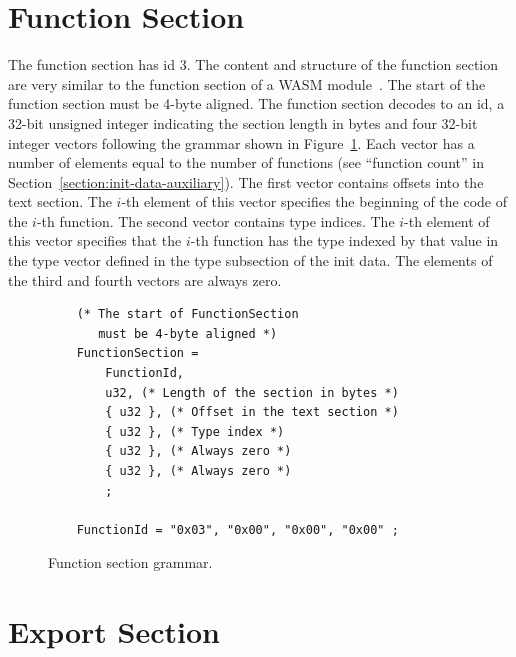 \documentclass{article}
\begin{document}
\section{Function Section}
The function section has id 3.
The content and structure of the function section are very similar to the function section of a WASM module~\cite[Sec.~5.5.6]{webassembly2019core}.
The start of the function section must be 4-byte aligned.
The function section decodes to an id, a 32-bit unsigned integer indicating the section length in bytes and four 32-bit integer vectors following the grammar shown in Figure~\ref{fig:function-section-grammar}.
Each vector has a number of elements equal to the number of functions (see ``function count'' in Section~\ref{section:init-data-auxiliary}).
The first vector contains offsets into the text section.
The $i$-th element of this vector specifies the beginning of the code of the $i$-th function.
The second vector contains type indices.
The $i$-th element of this vector specifies that the $i$-th function has the type indexed by that value in the type vector defined in the type subsection of the init data.
The elements of the third and fourth vectors are always zero.

\begin{figure}[H]
\begin{verbatim}
    (* The start of FunctionSection
       must be 4-byte aligned *)
    FunctionSection =
        FunctionId,
        u32, (* Length of the section in bytes *)
        { u32 }, (* Offset in the text section *)
        { u32 }, (* Type index *)
        { u32 }, (* Always zero *)
        { u32 }, (* Always zero *)
        ;

    FunctionId = "0x03", "0x00", "0x00", "0x00" ;
\end{verbatim}
\caption{Function section grammar.}
\label{fig:function-section-grammar}
\end{figure}

\section{Export Section}
\end{document}
